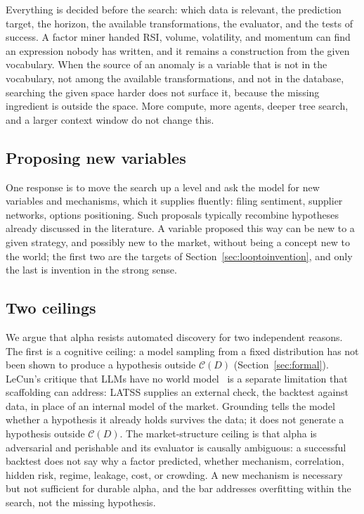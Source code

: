 \documentclass[11pt]{article}
\begin{document}
Everything is decided before the search: which data is relevant, the prediction target, the horizon,
the available transformations, the evaluator, and the tests of success. A factor miner handed RSI,
volume, volatility, and momentum can find an expression nobody has written, and it remains a
construction from the given vocabulary. When the source of an anomaly is a variable that is not in
the vocabulary, not among the available transformations, and not in the database, searching the given space
harder does not surface it, because the missing ingredient is outside the space. More compute, more
agents, deeper tree search, and a larger context window do not change this.

\subsection{Proposing new variables}

One response is to move the search up a level and ask the model for new variables and mechanisms,
which it supplies fluently: filing sentiment, supplier networks, options positioning. Such proposals
typically recombine hypotheses already discussed in the literature. A variable proposed this way can be
new to a given strategy, and possibly new to the market, without being a concept new to the world; the
first two are the targets of Section~\ref{sec:looptoinvention}, and only the last is invention in the
strong sense.

\subsection{Two ceilings}
\label{sec:two-ceilings}

We argue that alpha resists automated discovery for two independent reasons. The first is a cognitive
ceiling: a model sampling from a fixed distribution has not been shown to produce a hypothesis outside
$\mathcal{C}(D)$ (Section~\ref{sec:formal}). LeCun's critique that LLMs have no world model~\cite{lecunmtr} is a separate limitation
that scaffolding can address: LATSS supplies an external check, the backtest against data, in place of
an internal model of the market. Grounding tells the model whether a hypothesis
it already holds survives the data; it does not generate a hypothesis outside $\mathcal{C}(D)$. The
market-structure ceiling is that alpha is adversarial and perishable and its evaluator is causally
ambiguous: a successful backtest does not say why a factor predicted, whether mechanism, correlation,
hidden risk, regime, leakage, cost, or crowding. A new mechanism is necessary but not sufficient for
durable alpha, and the bar addresses overfitting within the search, not the missing hypothesis.
\end{document}
